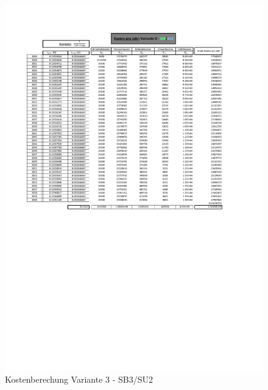 \begin{figure}[h!]
	\centering
	\includegraphics[width=\textwidth]{figures/Anhang/f-00-A-V3-B3-U2}
	\caption{Kostenberechung Variante 3 - SB3/SU2}
\end{figure}

